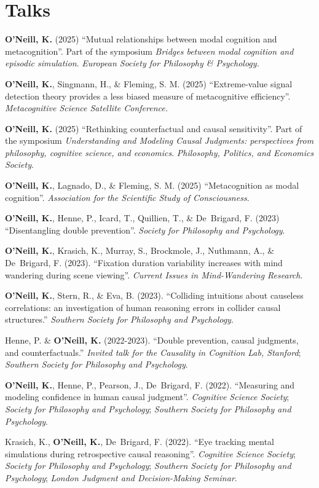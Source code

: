 \section{Talks}
\textbf{O'Neill, K.} (2025) ``Mutual relationships between modal
cognition and metacognition''. Part of the symposium \emph{Bridges
between modal cognition and episodic simulation}. \emph{European
Society for Philosophy \& Psychology.}

\textbf{O'Neill, K.}, Singmann, H., \& Fleming, S. M. (2025)
``Extreme-value signal detection theory provides a less biased measure
of metacognitive efficiency''. \emph{Metacognitive Science Satellite
Conference.}

\textbf{O'Neill, K.} (2025) ``Rethinking counterfactual and causal
sensitivity''. Part of the symposium \emph{Understanding and Modeling
Causal Judgments: perspectives from philosophy, cognitive science, and
economics}. \emph{Philosophy, Politics, and Economics Society}.

\textbf{O'Neill, K.}, Lagnado, D., \& Fleming, S. M. (2025)
``Metacognition as modal cognition''. \emph{Association for the
Scientific Study of Consciousness}.

\textbf{O'Neill, K.}, Henne, P., Icard, T., Quillien, T., \&
De~Brigard, F. (2023) ``Disentangling double
prevention''. \emph{Society for Philosophy and Psychology}.

\textbf{O'Neill, K.}, Krasich, K., Murray, S., Brockmole, J.,
Nuthmann, A., \& De~Brigard, F. (2023). ``Fixation duration variability
increases with mind wandering during scene viewing''. \emph{Current
Issues in Mind-Wandering Research}.

\textbf{O'Neill, K.}, Stern, R., \& Eva, B. (2023). ``Colliding
intuitions about causeless correlations: an investigation of human
reasoning errors in collider causal structures.'' \emph{Southern
Society for Philosophy and Psychology}.

Henne, P. \& \textbf{O'Neill, K.} (2022-2023). ``Double prevention,
causal judgments, and counterfactuals.'' \emph{Invited talk for the
Causality in Cognition Lab, Stanford}; \emph{Southern Society for
Philosophy and Psychology}.

\textbf{O'Neill, K.}, Henne, P., Pearson, J., De~Brigard,
F. (2022). ``Measuring and modeling confidence in human causal
judgment''. \emph{Cognitive Science Society}; \emph{Society for
Philosophy and Psychology}; \emph{Southern Society for Philosophy and
Psychology}.

Krasich, K., \textbf{O'Neill, K.}, De~Brigard, F. (2022). ``Eye
tracking mental simulations during retrospective causal
reasoning''. \emph{Cognitive Science Society}; \emph{Society for
Philosophy and Psychology}; \emph{Southern Society for Philosophy and
Psychology}; \emph{London Judgment and Decision-Making Seminar}.

